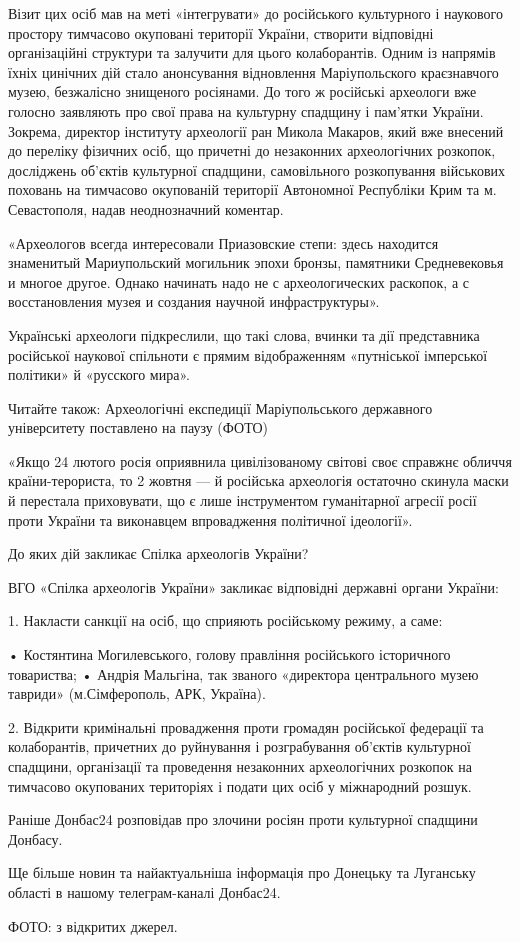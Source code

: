 Візит цих осіб мав на меті «інтегрувати» до російського культурного і наукового
простору тимчасово окуповані території України, створити відповідні
організаційні структури та залучити для цього колаборантів. Одним із напрямів
їхніх цинічних дій стало анонсування відновлення Маріупольского краєзнавчого
музею, безжалісно знищеного росіянами. До того ж російські археологи вже
голосно заявляють про свої права на культурну спадщину і пам’ятки України.
Зокрема, директор інституту археології ран Микола Макаров, який вже внесений до
переліку фізичних осіб, що причетні до незаконних археологічних розкопок,
досліджень об'єктів культурної спадщини, самовільного розкопування військових
поховань на тимчасово окупованій території Автономної Республіки Крим та м.
Севастополя, надав неоднозначний коментар.

«Археологов всегда интересовали Приазовские степи: здесь находится знаменитый
Мариупольский могильник эпохи бронзы, памятники Средневековья и многое другое.
Однако начинать надо не с археологических раскопок, а с восстановления музея и
создания научной инфраструктуры».

Українські археологи підкреслили, що такі слова, вчинки та дії представника
російської наукової спільноти є прямим відображенням «путніської імперської
політики» й «русского мира».

Читайте також: Археологічні експедиції Маріупольського державного університету
поставлено на паузу (ФОТО)

«Якщо 24 лютого росія оприявнила цивілізованому світові своє справжнє обличчя
країни-терориста, то 2 жовтня — й російська археологія остаточно скинула маски
й перестала приховувати, що є лише інструментом гуманітарної агресії росії
проти України та виконавцем впровадження політичної ідеології».

До яких дій закликає Спілка археологів України?

ВГО «Спілка археологів України» закликає відповідні державні органи України:

1. Накласти санкції на осіб, що сприяють російському режиму, а саме:

• Костянтина Могилевського, голову правління російського історичного товариства;
• Андрія Мальгіна, так званого «директора центрального музею тавриди» (м.Сімферополь, АРК, Україна).

2. Відкрити кримінальні провадження проти громадян російської федерації та
колаборантів, причетних до руйнування і розграбування об'єктів культурної
спадщини, організації та проведення незаконних археологічних розкопок на
тимчасово окупованих територіях і подати цих осіб у міжнародний розшук.

Раніше Донбас24 розповідав про злочини росіян проти культурної спадщини Донбасу.

Ще більше новин та найактуальніша інформація про Донецьку та Луганську області в нашому телеграм-каналі Донбас24.

ФОТО: з відкритих джерел.
